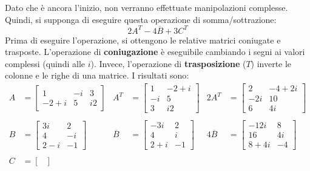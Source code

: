 \documentclass[a4paper]{article}
\begin{document}
	\noindent
	Dato che è ancora l'inizio, non verranno effettuate manipolazioni complesse. Quindi, si supponga di eseguire questa operazione di somma/sottrazione:
	\begin{equation*}
		2A^{T} - 4\overline{B} + 3C^{T}
	\end{equation*}
	Prima di eseguire l'operazione, si ottengono le relative matrici coniugate e trasposte. L'operazione di \textbf{coniugazione} è eseguibile cambiando i segni ai valori complessi (quindi alle $i$). Invece, l'operazione di \textbf{trasposizione} ($T$) inverte le colonne e le righe di una matrice. I risultati sono:
	\begin{equation*}
		\begin{array}{lllllllll}
			A & = \begin{bmatrix}
				1 	& -i	& 3	\\
				-2+i&  5 	& i2
			\end{bmatrix} &
			A^{T} & = \begin{bmatrix}
				1	& -2+i	\\
				-i	& 5		\\
				3	& i2
			\end{bmatrix} &
			2A^{T} & = \begin{bmatrix}
				2	& -4+2i	\\
				-2i	& 10	\\
				6	& 4i
			\end{bmatrix} \\
			&&&&& \\
			B & = \begin{bmatrix}
				3i	& 2		\\
				4	& -i 	\\
				2-i	& -1
			\end{bmatrix} &
			\overline{B} & = \begin{bmatrix}
				-3i	& 2		\\
				4	& i		\\
				2+i	& -1
			\end{bmatrix} &
			4\overline{B} & = \begin{bmatrix}
				-12i	& 8		\\
				16		& 4i	\\
				8+4i	& -4
			\end{bmatrix} \\
			&&&&& \\
			C & = \begin{bmatrix}

\end{bmatrix}
\end{array}
\end{equation*}
\end{document}
